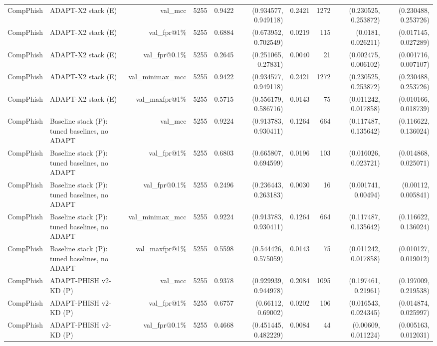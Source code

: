 \begin{table}[t]
\begin{tabular}{llrrrrrrrr}
CompPhish & ADAPT-X2 stack (E) & val\_mcc & 5255 & 0.9422 & (0.934577, 0.949118) & 0.2421 & 1272 & (0.230525, 0.253872) & (0.230488, 0.253726) \\
CompPhish & ADAPT-X2 stack (E) & val\_fpr@1\% & 5255 & 0.6884 & (0.673952, 0.702549) & 0.0219 & 115 & (0.0181, 0.026211) & (0.017145, 0.027289) \\
CompPhish & ADAPT-X2 stack (E) & val\_fpr@0.1\% & 5255 & 0.2645 & (0.251065, 0.27831) & 0.0040 & 21 & (0.002475, 0.006102) & (0.001716, 0.007107) \\
CompPhish & ADAPT-X2 stack (E) & val\_minimax\_mcc & 5255 & 0.9422 & (0.934577, 0.949118) & 0.2421 & 1272 & (0.230525, 0.253872) & (0.230488, 0.253726) \\
CompPhish & ADAPT-X2 stack (E) & val\_maxfpr@1\% & 5255 & 0.5715 & (0.556179, 0.586716) & 0.0143 & 75 & (0.011242, 0.017858) & (0.010166, 0.018739) \\
CompPhish & Baseline stack (P): tuned baselines, no ADAPT & val\_mcc & 5255 & 0.9224 & (0.913783, 0.930411) & 0.1264 & 664 & (0.117487, 0.135642) & (0.116622, 0.136024) \\
CompPhish & Baseline stack (P): tuned baselines, no ADAPT & val\_fpr@1\% & 5255 & 0.6803 & (0.665807, 0.694599) & 0.0196 & 103 & (0.016026, 0.023721) & (0.014868, 0.025071) \\
CompPhish & Baseline stack (P): tuned baselines, no ADAPT & val\_fpr@0.1\% & 5255 & 0.2496 & (0.236443, 0.263183) & 0.0030 & 16 & (0.001741, 0.00494) & (0.00112, 0.005841) \\
CompPhish & Baseline stack (P): tuned baselines, no ADAPT & val\_minimax\_mcc & 5255 & 0.9224 & (0.913783, 0.930411) & 0.1264 & 664 & (0.117487, 0.135642) & (0.116622, 0.136024) \\
CompPhish & Baseline stack (P): tuned baselines, no ADAPT & val\_maxfpr@1\% & 5255 & 0.5598 & (0.544426, 0.575059) & 0.0143 & 75 & (0.011242, 0.017858) & (0.010127, 0.019012) \\
CompPhish & ADAPT-PHISH v2-KD (P) & val\_mcc & 5255 & 0.9378 & (0.929939, 0.944978) & 0.2084 & 1095 & (0.197461, 0.21961) & (0.197009, 0.219538) \\
CompPhish & ADAPT-PHISH v2-KD (P) & val\_fpr@1\% & 5255 & 0.6757 & (0.66112, 0.69002) & 0.0202 & 106 & (0.016543, 0.024345) & (0.014874, 0.025997) \\
CompPhish & ADAPT-PHISH v2-KD (P) & val\_fpr@0.1\% & 5255 & 0.4668 & (0.451445, 0.482229) & 0.0084 & 44 & (0.00609, 0.011224) & (0.005163, 0.012031) \\

\end{tabular}
\end{table}

